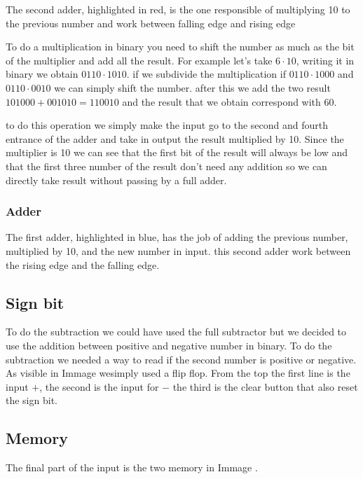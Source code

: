 \documentclass{article}
\begin{document}
\vspace{3mm}

The second adder, highlighted in red, is the one responsible of multiplying 10 to the previous number and work between falling edge and rising edge

To do a multiplication in binary you need to shift the number as much as the bit of the multiplier and add all the result. For example let's take $6 \cdot 10$, writing it in binary we obtain 
$0110 \cdot 1010$. if we subdivide the multiplication if $0110 \cdot 1000$ and $0110 \cdot 0010$ we can simply shift the number. 
after this we add the two result $101000 + 001010 = 110010$ and the result that we obtain correspond with 60.

\vspace{3mm}

to do this operation we simply make the input go to the second and fourth entrance of the adder and take in output the result multiplied by 10. Since the multiplier is 10 we can see that the first bit of the result will always be low and that the first three number of the result don't need any addition so we can directly take result without passing by a full adder.


\subsubsection{Adder}

The first adder, highlighted in blue, has the job of adding the previous number, multiplied by 10, and the new number in input. this second adder work between the rising edge and the falling edge.



\subsection{Sign bit}

To do the subtraction we could have used the full subtractor but we decided to use the addition between positive and negative number in binary. To do the subtraction we needed a way to read if the second number is positive or negative. As visible in Immage %
wesimply used a flip flop. 
From the top the first line is the input $+$, the second is the input for $-$ the third is the clear button that also reset the sign bit.




\subsection{Memory}
The final part of the input is the two memory in Immage %
.
\end{document}
